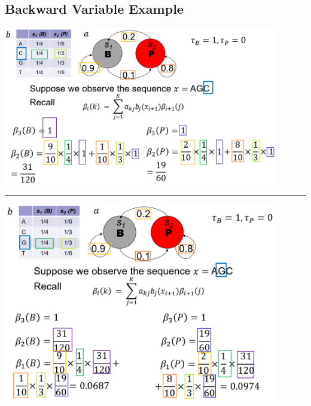 \documentclass[10pt]{article}
\begin{document}
\subsection*{Backward Variable Example}
\begin{center} 
	\includegraphics*[width=0.9\textwidth]{W9_17.png}\\
    \rule{\textwidth}{2pt}
    \includegraphics*[width=0.9\textwidth]{W9_18.png}\\
\end{center}
\end{document}
